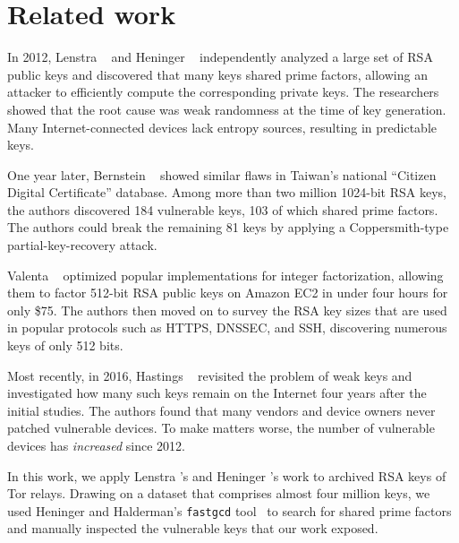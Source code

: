 \section{Related work}
In 2012, Lenstra \ea~\cite{Lenstra2012a} and Heninger \ea~\cite{Heninger2012a}
independently analyzed a large set of RSA public keys and discovered that many
keys shared prime factors, allowing an attacker to efficiently compute the
corresponding private keys.  The researchers showed that the root cause was weak
randomness at the time of key generation.  Many Internet-connected devices lack
entropy sources, resulting in predictable keys.

One year later, Bernstein \ea~\cite{Bernstein2013a} showed similar flaws in
Taiwan's national ``Citizen Digital Certificate'' database.  Among more than two
million 1024-bit RSA keys, the authors discovered 184 vulnerable keys, 103 of
which shared prime factors.  The authors could break the remaining 81 keys by
applying a Coppersmith-type partial-key-recovery attack.

Valenta \ea~\cite{Valenta2016a} optimized popular implementations for integer
factorization, allowing them to factor 512-bit RSA public keys on Amazon EC2 in
under four hours for only \$75.  The authors then moved on to survey the RSA key
sizes that are used in popular protocols such as HTTPS, DNSSEC, and SSH,
discovering numerous keys of only 512 bits.

Most recently, in 2016, Hastings \ea~\cite{Hastings2016a} revisited the problem
of weak keys and investigated how many such keys remain on the Internet four
years after the initial studies.  The authors found that many vendors and device
owners never patched vulnerable devices.  To make matters worse, the number of
vulnerable devices has \emph{increased} since 2012.

In this work, we apply Lenstra \ea's and Heninger \ea's work to archived RSA
keys of Tor relays.  Drawing on a dataset that comprises almost four million
keys, we used Heninger and Halderman's \texttt{fastgcd} tool~\cite{fastgcd} to
search for shared prime factors and manually inspected the vulnerable keys that
our work exposed.
